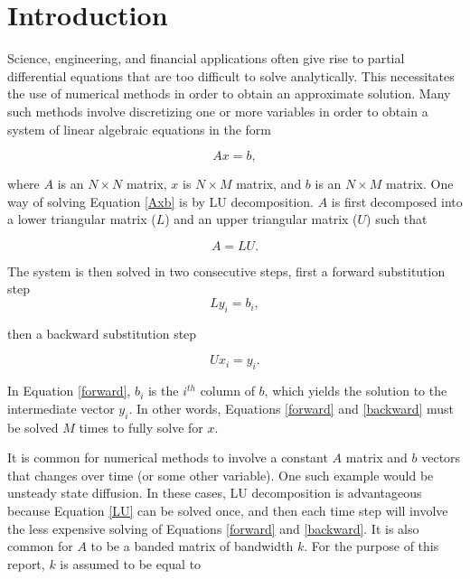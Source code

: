 \documentclass[12pt]{article}
\begin{document}
\newpage
\tableofcontents
\newpage
\section{Introduction}
\label{sec:introduction}

Science, engineering, and financial applications often give rise to partial
differential equations that are too difficult to solve analytically.
This necessitates the use of numerical methods in order to obtain an
approximate solution. Many such methods involve discretizing one or more
variables in order to obtain a system of linear algebraic equations in the
form

\begin{equation}
\label{Axb}
Ax=b,
\end{equation}

\noindent
where $A$ is an $N \times N$ matrix, $x$ is $N \times M$ matrix,
and $b$ is an $N \times M$ matrix. One way of solving Equation \ref{Axb} is by
LU decomposition. $A$ is first decomposed into a lower triangular matrix ($L$)
and an upper triangular matrix ($U$) such that

\begin{equation}
\label{LU}
A = LU.
\end{equation}

\noindent
The system is then solved in two consecutive steps, first a forward substitution step
\begin{equation}
\label{forward}
Ly_i = b_i,
\end{equation}

\noindent
then a backward substitution step

\begin{equation}
\label{backward}
Ux_i = y_i.
\end{equation}

\noindent
In Equation \ref{forward}, $b_i$ is the $i^{th}$ column of $b$, which yields
the solution to the intermediate vector $y_i$. In other words, Equations
\ref{forward} and \ref{backward} must be solved $M$ times to fully solve for
$x$.

It is common for numerical methods to involve a constant $A$ matrix and
$b$ vectors that changes over time (or some other variable). One such example
would be unsteady state diffusion. In these cases, LU decomposition is
advantageous because Equation \ref{LU} can be solved once, and then each
time step will involve the less expensive solving of Equations \ref{forward} and
\ref{backward}. It is also common for $A$ to be a banded matrix of bandwidth $k$. For the
purpose of this report, $k$ is assumed to be equal to
\end{document}
